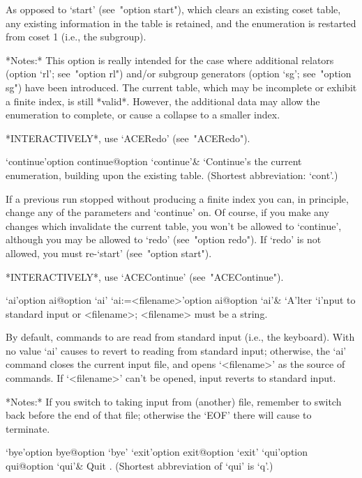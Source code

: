 As opposed to `start' (see~"option start"), which clears  an  existing
coset table, any existing information in the table  is  retained,  and
the enumeration is restarted from coset 1 (i.e., the subgroup).

*Notes:*
This option is really intended for the case where additional  relators
(option `rl'; see~"option  rl")  and/or  subgroup  generators  (option
`sg'; see~"option sg") have been introduced. The current table,  which
may be incomplete  or  exhibit  a  finite  index,  is  still  *valid*.
However, the additional data may allow the enumeration to complete, or
cause a collapse to a smaller index.

*INTERACTIVELY*, use `ACERedo' (see~"ACERedo").

\>`continue'{option continue}@{option `continue'}&
`Continue's the current enumeration, building upon the existing table.
(Shortest abbreviation: `cont'.)

If a previous run stopped without producing a finite index you can, in
principle, change any of the parameters and `continue' on. Of  course,
if you make any changes which invalidate the current table, you  won't
be allowed to `continue',  although  you  may  be  allowed  to  `redo'
(see~"option redo"). If `redo' is not  allowed,  you  must  re-`start'
(see~"option start").

*INTERACTIVELY*, use `ACEContinue' (see~"ACEContinue").

\enditems


\beginitems

\>`ai'{option ai}@{option `ai'}
\>`ai:=<filename>'{option ai}@{option `ai'}&
`A'lter `i'nput to standard input or <filename>; <filename> must be  a
string.

By default, commands to {\ACE} are read from standard input (i.e., the
keyboard). With no value `ai' causes {\ACE} to revert to reading  from
standard input; otherwise, the `ai' command closes the  current  input
file,  and  opens  `<filename>'  as  the  source   of   commands.   If
`<filename>' can't be opened, input reverts to standard input.

*Notes:*
If you switch to taking input from (another) file, remember to  switch
back before the end of that file; otherwise the `EOF' there will cause
{\ACE} to terminate.

\>`bye'{option bye}@{option `bye'}
\>`exit'{option exit}@{option `exit'}
\>`qui'{option qui}@{option `qui'}&
Quit {\ACE}. (Shortest abbreviation of `qui' is `q'.)

